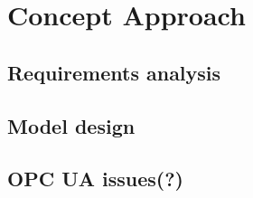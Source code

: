 \chapter{Concept Approach}
\section{Requirements analysis}
\section{Model design}
\section{OPC UA issues(?)}
